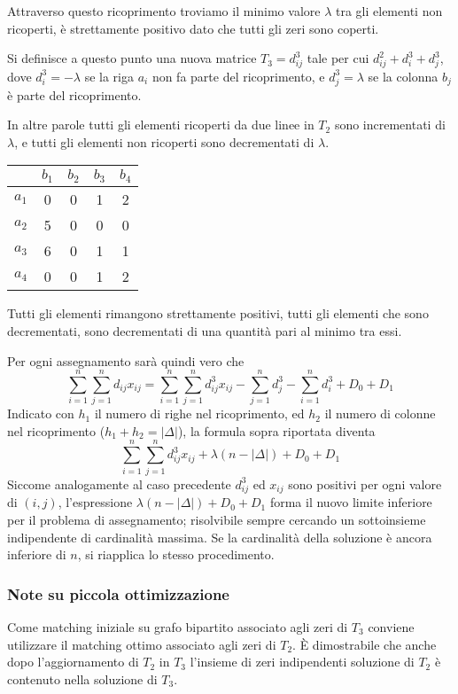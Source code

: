 \documentclass[../template]{subfiles}
\begin{document}
Attraverso questo ricoprimento troviamo il minimo valore $\lambda$ tra gli elementi non ricoperti, è strettamente
positivo dato che tutti gli zeri sono coperti.

Si definisce a questo punto una nuova matrice $T_3 = d_{ij}^3$ tale per cui $d_{ij}^2 + d_i^3 + d_j^3$, dove
$d_i^3 = -\lambda$ se la riga $a_i$ non fa parte del ricoprimento, e $d_j^3 = \lambda$ se la colonna $b_j$ è parte del
ricoprimento.

In altre parole tutti gli elementi ricoperti da due linee in $T_2$ sono incrementati di $\lambda$, e tutti gli elementi
non ricoperti sono decrementati di $\lambda$.

\begin{table}[h]
    \centering
    \begin{tabular}{|c|cccc|}
        \hline
        & $b_1$ & $b_2$ & $b_3$ & $b_4$\\
        \hline
        $a_1$ & 0 & 0 & 1 & 2\\
        $a_2$ & 5 & 0 & 0 & 0\\
        $a_3$ & 6 & 0 & 1 & 1\\
        $a_4$ & 0 & 0 & 1 & 2\\
        \hline
    \end{tabular}
\end{table}
Tutti gli elementi rimangono strettamente positivi, tutti gli elementi che sono decrementati, sono decrementati di una
quantità pari al minimo tra essi.

Per ogni assegnamento sarà quindi vero che
\[
    \sum^n_{i=1}\sum^n_{j=1} d_{ij} x_{ij}  =
    \sum^n_{i=1}\sum^n_{j=1} d_{ij}^3 x_{ij}  - \sum^n_{j = 1} d^3_j - \sum^n_{i=1} d_i^3 + D_0 + D_1
\]
Indicato con $h_1$ il numero di righe nel ricoprimento, ed $h_2$ il numero di colonne nel ricoprimento ($h_1 + h_2 =
|\Delta|$), la formula sopra riportata diventa
\[
    \sum^n_{i=1}\sum^n_{j=1} d_{ij}^3 x_{ij}  +\lambda (n - |\Delta|) + D_0 + D_1
\]
Siccome analogamente al caso precedente $d^3_{ij}$ ed $x_{ij}$ sono positivi per ogni valore di $(i,j)$, l'espressione
$\lambda (n - |\Delta|) + D_0 + D_1$ forma il nuovo limite inferiore per il problema di assegnamento; risolvibile sempre
cercando un sottoinsieme indipendente di cardinalità massima.
Se la cardinalità della soluzione è ancora inferiore di $n$, si riapplica lo stesso procedimento.

\subsubsection{Note su piccola ottimizzazione}
Come matching iniziale su grafo bipartito associato agli zeri di $T_3$ conviene utilizzare il matching ottimo associato
agli zeri di $T_2$. È dimostrabile che anche dopo l'aggiornamento di $T_2$ in $T_3$ l'insieme di zeri indipendenti
soluzione di $T_2$ è contenuto nella soluzione di $T_3$.
\end{document}
